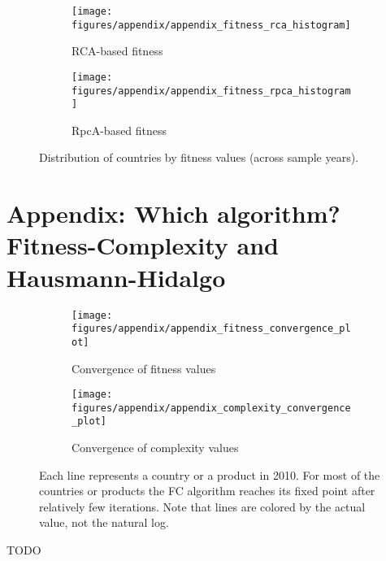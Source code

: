 \documentclass[11pt]{article}
\begin{document}
\begin{appendices}
\begin{figure}
     \centering
     \begin{subfigure}[b]{0.45\textwidth}
         \centering
         \texttt{[image: figures/appendix/appendix\_fitness\_rca\_histogram]}
         \caption{RCA-based fitness}
         \label{fig:rca_fit_hist}
     \end{subfigure}
     \hfill
     \begin{subfigure}[b]{0.45\textwidth}
         \centering
         \texttt{[image: figures/appendix/appendix\_fitness\_rpca\_histogram]}
         \caption{RpcA-based fitness}
         \label{fig:rpca_fit_hist}
     \end{subfigure}
        \caption{Distribution of countries by fitness values (across sample years).}
        \label{fig:rca_rpca_fit_hist}
\end{figure}



\newpage

\section{Appendix: Which algorithm? Fitness-Complexity and Hausmann-Hidalgo}
\label{sec:appendix-algorithm}

\begin{figure}
     \centering
     \begin{subfigure}[b]{0.45\textwidth}
         \centering
         \texttt{[image: figures/appendix/appendix\_fitness\_convergence\_plot]}
	 \caption{Convergence of fitness values}
         \label{fig:fit_conv}
     \end{subfigure}
     \hfill
     \begin{subfigure}[b]{0.45\textwidth}
         \centering
         \texttt{[image: figures/appendix/appendix\_complexity\_convergence\_plot]}
         \caption{Convergence of complexity values}
         \label{fig:comp_conv}
     \end{subfigure}
     \caption{Each line represents a country or a product in 2010. For most of the countries or products the FC algorithm reaches its fixed point after relatively few iterations. Note that lines are colored by the actual value, not the natural log.}
        \label{fig:fc_conv}
\end{figure}


TODO

\end{appendices}

\newpage
\end{document}
